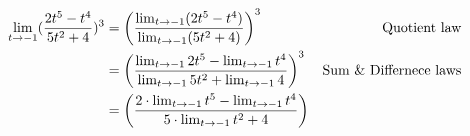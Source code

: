 \documentclass{../../classes/anal}
\begin{document}
    \begin{problem}{9}
        \begin{align*}
            \lim_{t\rightarrow-1}({2t^5-t^4 \over 5t^2+4})^3
            &= \left({\lim_{t\rightarrow-1}(2t^5-t^4) \over \lim_{t\rightarrow-1}(5t^2+4)}\right)^3 & \text{Quotient law} \\
            &= \left({\lim_{t\rightarrow-1}2t^5 - \lim_{t\rightarrow-1}t^4 \over \lim_{t\rightarrow-1}5t^2 + \lim_{t\rightarrow-1}4}\right)^3 & \text{Sum \& Differnece laws} \\
            &= \left({2\cdot\lim_{t\rightarrow-1}t^5-\lim_{t\rightarrow-1}t^4 \over 5\cdot\lim_{t\rightarrow-1}t^2+4}\right)
        \end{align*}
    \end{problem}
\end{document}
